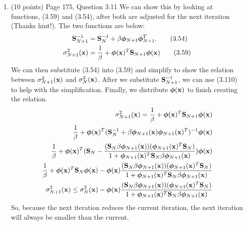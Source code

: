 \documentclass[11pt]{article}
\begin{document}
\begin{enumerate}
\item (10 points) Page 175, Question 3.11
We can show this by looking at functions, (3.59) and (3.54), after both are adjusted for the next iteration (Thanks hint!). 
The two functions are below:
\begin{align*}
      \mathbf{S}_{N+1}^{-1} &= \mathbf{S}_N^{-1} + \beta \bm{\phi}_{N+1} \bm{\phi}_{N+1}^T. \tag{3.54}\\
      \sigma_{N+1}^2 (\mathbf{x}) &= \frac{1}{\beta} + \bm{\phi}(\mathbf{x})^T \mathbf{S}_{N+1} \bm{\phi}(\mathbf{x}) \tag{3.59}
\end{align*}
We can then substitute (3.54) into (3.59) and simplify to show the relation between $\sigma_{N+1}^2 (\mathbf{x})$ and $\sigma_{N}^2 (\mathbf{x})$.
After we substitute $\mathbf{S}_{N+1}^{-1}$, we can use (3.110) to help with the simplification. Finally, we distribute $\bm{\phi}(\mathbf{x})$
to finish creating the relation.
\begin{align*}
      \sigma_{N+1}^2 (\mathbf{x}) = \frac{1}{\beta} + \bm{\phi}(\mathbf{x})^T \mathbf{S}_{N+1} \bm{\phi}(\mathbf{x})\\
      \frac{1}{\beta} + \bm{\phi}(\mathbf{x})^T (\mathbf{S}_{N}^{-1} + \beta \bm{\phi}_{N+1}(\mathbf{x}) \bm{\phi}_{N+1}(\mathbf{x})^T)^{-1} \bm{\phi}(\mathbf{x})\\
      \frac{1}{\beta} + \bm{\phi}(\mathbf{x})^T (\mathbf{S}_{N} - \frac{(\mathbf{S}_{N} \beta \bm{\phi}_{N+1}(\mathbf{x}))(\bm{\phi}_{N+1}(\mathbf{x})^T \mathbf{S}_{N})}
      {1+\bm{\phi}_{N+1}(\mathbf{x})^T\mathbf{S}_{N}\beta \bm{\phi}_{N+1}(\mathbf{x})}) \bm{\phi}(\mathbf{x})\\
      \frac{1}{\beta} + \bm{\phi}(\mathbf{x})^T \mathbf{S}_{N} \bm{\phi}(\mathbf{x}) - \bm{\phi}(\mathbf{x}) \frac{(\mathbf{S}_{N} \beta \bm{\phi}_{N+1}(\mathbf{x}))(\bm{\phi}_{N+1}(\mathbf{x})^T \mathbf{S}_{N})}
      {1+\bm{\phi}_{N+1}(\mathbf{x})^T\mathbf{S}_{N}\beta \bm{\phi}_{N+1}(\mathbf{x})}\\
      \sigma_{N+1}^2 (\mathbf{x}) \leq \sigma_{N}^2 (\mathbf{x}) - \bm{\phi}(\mathbf{x}) \frac{(\mathbf{S}_{N} \beta \bm{\phi}_{N+1}(\mathbf{x}))(\bm{\phi}_{N+1}(\mathbf{x})^T \mathbf{S}_{N})}
      {1+\bm{\phi}_{N+1}(\mathbf{x})^T\mathbf{S}_{N}\beta \bm{\phi}_{N+1}(\mathbf{x})}
\end{align*}
So, because the next iteration reduces the current iteration, the next iteration will always be smaller than the current.
\end{enumerate}
\end{document}
